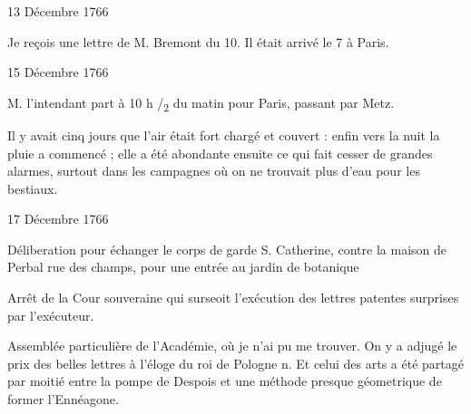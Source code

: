                      \begin{diary}{13 Décembre 1766}{}

                         Je reçois une lettre de M.
                              Bremont du 10. Il
                           était arrivé le 7 à Paris. \bigskip


                     \end{diary}


                     \begin{diary}{15 Décembre 1766}{}


                           M. l’intendant part à 10 h /\textsubscript{2} du matin
                           pour Paris, passant par
                              Metz. \bigskip


                         Il y avait cinq jours que l’air
                           était fort chargé
                           et couvert : enfin vers la nuit la pluie a
                           commencé ; elle a été abondante ensuite
                           ce qui fait cesser de grandes alarmes, surtout
                           dans les campagnes où on ne trouvait plus
                           d’eau pour les bestiaux. \bigskip


                     \end{diary}

                     \begin{diary}{17 Décembre 1766}{}

                         Déliberation pour échanger le corps de garde
                              S. Catherine, contre la maison de Perbal rue
                              des champs, pour une entrée au jardin de botanique
                        \bigskip


                         Arrêt de la Cour souveraine qui surseoit l’exécution des
                           lettres patentes surprises par
                           l’exécuteur. \bigskip


                         Assemblée particulière de l’Académie,
                           où je n’ai pu me trouver. On y a adjugé
                           le prix des belles lettres à l’éloge du roi de Pologne n.
                           Et celui des arts a été partagé par moitié
                           entre la pompe de Despois et une méthode
                              presque géometrique de former l’Ennéagone. \bigskip


                     \end{diary}

